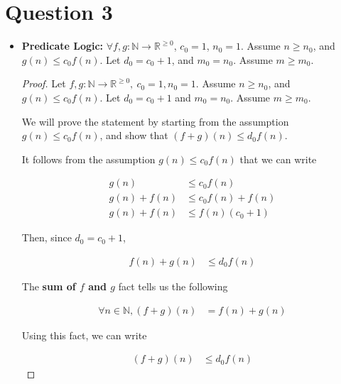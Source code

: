 \documentclass[12pt]{article}
\begin{document}
\section*{Question 3}
\begin{itemize}
    \item

    \textbf{Predicate Logic:} $\forall f,g: \mathbb{N} \to \mathbb{R}^{\geq 0}$,
    $c_0 = 1$, $n_0 = 1$. Assume $n \geq n_0$, and $g(n) \leq c_0f(n)$. Let $d_0 = c_0 + 1$,
    and $m_0 = n_0$. Assume $m \geq m_0$.

    \bigskip

    \begin{proof}
        Let $f,g: \mathbb{N} \to \mathbb{R}^{\geq 0},\:c_0 = 1, n_0 = 1$. Assume $n \geq n_0$,
        and $g(n) \leq c_0f(n)$. Let $d_0 = c_0 + 1$ and $m_0 = n_0$. Assume $m \geq m_0$.

        \bigskip

        We will prove the statement by starting from the assumption $g(n) \leq c_0f(n)$,
        and show that $(f + g)(n) \leq d_0f(n)$.

        \bigskip

        It follows from the assumption $g(n) \leq c_0f(n)$ that we can write

        \setcounter{equation}{0}
        \begin{align}
            g(n) &\leq c_0f(n)\\
            g(n) + f(n) &\leq c_0f(n) + f(n)\\
            g(n) + f(n) &\leq f(n)(c_0 + 1)
        \end{align}

        \bigskip

        Then, since $d_0 = c_0 + 1$,

        \begin{align}
            f(n) + g(n) &\leq d_0f(n)
        \end{align}

        \bigskip

        The \textbf{sum of $f$ and $g$} fact tells us the following

        \begin{align}
            \forall n \in \mathbb{N}, (f+g)(n) &= f(n) + g(n)
        \end{align}

        \bigskip

        Using this fact, we can write

        \begin{align}
            (f + g)(n) &\leq d_0f(n)
        \end{align}
    \end{proof}

\end{itemize}
\end{document}
